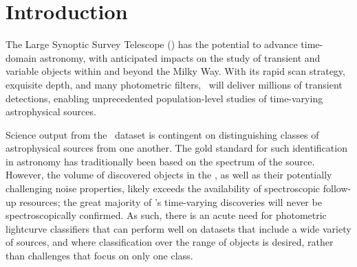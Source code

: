 \section{Introduction}
\label{sec:intro}

The Large Synoptic Survey Telescope (\lsst) has the potential to advance time-domain astronomy, with anticipated impacts on the study of transient and variable objects within and beyond the Milky Way.
With its rapid scan strategy, exquisite depth, and many photometric filters, \lsst\ will deliver millions of transient detections, enabling unprecedented population-level studies of time-varying astrophysical sources.

Science output from the \lsst\ dataset is contingent on distinguishing classes of astrophysical sources from one another.
The gold standard for such identification in astronomy has traditionally been based on the spectrum of the source.
However, the volume of discovered objects in the \lsst, as well as their potentially challenging noise properties, likely exceeds the availability of spectroscopic follow-up resources; the great majority of \lsst's time-varying discoveries will never be spectroscopically confirmed.
As such, there is an acute need for photometric lightcurve classifiers that can perform well on datasets that include a wide variety of sources, and where classification over the range of objects is desired, rather than challenges that focus on only one class.

